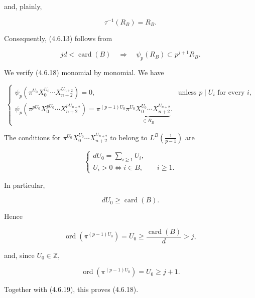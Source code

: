 and, plainly,

\begin{equation}\tag{4.6.17}
\tau^{-1}(R_B)=R_B.
\end{equation}

Consequently, (4.6.13) follows from

\begin{equation}\tag{4.6.18}
jd<\operatorname{card}(B)
\quad\Longrightarrow\quad
\psi_p(R_B)\subset p^{j+1}R_B.
\end{equation}

We verify (4.6.18) monomial by monomial.  We have

\begin{equation}\tag{4.6.19}
\begin{cases}
\psi_p\!\left(\pi^{U_0}X_0^{U_0}\cdots X_{n+2}^{U_{n+2}}\right)=0,
&\text{unless }p\mid U_i\text{ for every }i,\\[3pt]
\psi_p\!\left(
\pi^{pU_0}X_0^{pU_0}\cdots X_{n+2}^{pU_{n+2}}
\right)
=\pi^{(p-1)U_0}
\underbrace{\pi^{U_0}X_0^{U_0}\cdots X_{n+2}^{U_{n+2}}}_{\in R_B}.
\end{cases}
\end{equation}

The conditions for
$\pi^{U_0}X_0^{U_0}\cdots X_{n+2}^{U_{n+2}}$ to belong to
$L^B\!\left(\frac1{p-1}\right)$ are

\begin{equation}\tag{4.6.20}
\begin{cases}
dU_0=\displaystyle\sum_{i\geq1}U_i,\\
U_i>0\Longleftrightarrow i\in B,\qquad i\geq1.
\end{cases}
\end{equation}

In particular,

\begin{equation}\tag{4.6.21}
dU_0\geq\operatorname{card}(B).
\end{equation}

Hence

\begin{equation}\tag{4.6.22}
\operatorname{ord}\!\left(\pi^{(p-1)U_0}\right)
=U_0\geq\frac{\operatorname{card}(B)}d>j,
\end{equation}

and, since $U_0\in\mathbb Z$,

\begin{equation}\tag{4.6.23}
\operatorname{ord}\!\left(\pi^{(p-1)U_0}\right)
=U_0\geq j+1.
\end{equation}

Together with (4.6.19), this proves (4.6.18).

